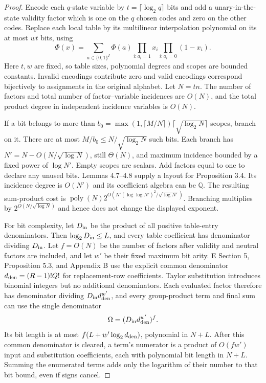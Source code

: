 \begin{proof}
Encode each $q$-state variable by $t=\lceil\log_2q\rceil$ bits and add a unary-in-the-state validity factor which is one on the $q$ chosen codes and zero on the other codes. Replace each local table by its multilinear interpolation polynomial on its at most $wt$ bits, using
\[
 \Phi(x)=\sum_{a\in\{0,1\}^{I}}\Phi(a)
 \prod_{i:a_i=1}x_i\prod_{i:a_i=0}(1-x_i).
\]
Here $t,w$ are fixed, so table sizes, polynomial degrees and scopes are bounded constants. Invalid encodings contribute zero and valid encodings correspond bijectively to assignments in the original alphabet. Let $N=tn$. The number of factors and total number of factor--variable incidences are $O(N)$, and the total product degree in independent incidence variables is $O(N)$.

If a bit belongs to more than $b_0=\max(1,\lceil M/N\rceil)\lceil\sqrt{\log_2N}\rceil$ scopes, branch on it. There are at most $M/b_0\leq N/\sqrt{\log_2N}$ such bits. Each branch has $N'=N-O(N/\sqrt{\log N})$, still $\Theta(N)$, and maximum incidence bounded by a fixed power of $\log N'$. Empty scopes are scalars. Add factors equal to one to declare any unused bits. Lemmas 4.7--4.8 supply a layout for Proposition 3.4. Its incidence degree is $O(N')$ and its coefficient algebra can be $\mathbb Q$. The resulting sum-product cost is $\operatorname{poly}(N)2^{O(N'(\log\log N')^2/\sqrt{\log N'})}$. Branching multiplies by $2^{O(N/\sqrt{\log N})}$ and hence does not change the displayed exponent.

For bit complexity, let $D_{\rm in}$ be the product of all positive table-entry denominators. Then $\log_2D_{\rm in}\leq L$, and every table coefficient has denominator dividing $D_{\rm in}$. Let $f=O(N)$ be the number of factors after validity and neutral factors are included, and let $w'$ be their fixed maximum bit arity. E Section 5, Proposition 5.3, and Appendix B use the explicit common denominator $d_{\rm den}=(R-1)!Q!$ for replacement-row coefficients. Taylor substitution introduces binomial integers but no additional denominators. Each evaluated factor therefore has denominator dividing $D_{\rm in}d_{\rm den}^{w'}$, and every group-product term and final sum can use the single denominator
\[
 \Omega=(D_{\rm in}d_{\rm den}^{w'})^f.
\]
Its bit length is at most $f(L+w'\log_2d_{\rm den})$, polynomial in $N+L$. After this common denominator is cleared, a term's numerator is a product of $O(fw')$ input and substitution coefficients, each with polynomial bit length in $N+L$. Summing the enumerated terms adds only the logarithm of their number to that bit bound, even if signs cancel.


\end{proof}
